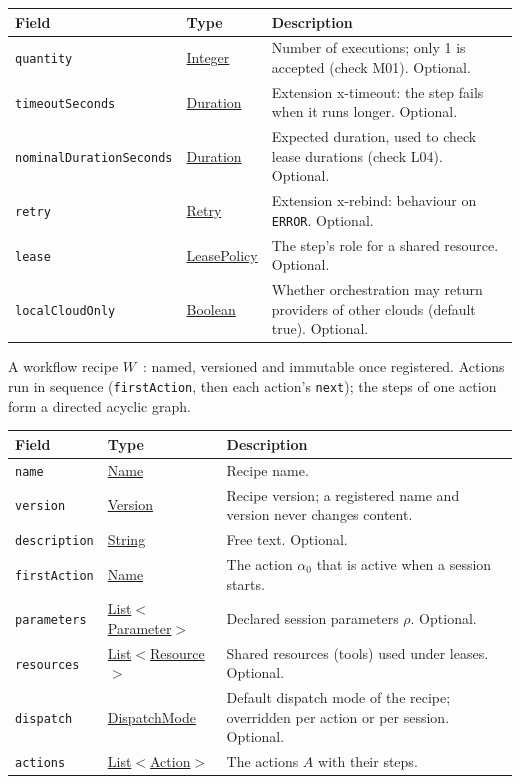 \documentclass[a4paper]{arrowhead}
\newcommand{\mref}[1]{{\textcolor{ArrowheadPurple}{\hyperref[sec:model:#1]{#1}}}}
\newcommand{\pref}[1]{{\textcolor{ArrowheadGrey}{\hyperref[sec:model:primitives:#1]{#1}}}}
\begin{document}
{\small
\begin{longtable}{|p{3.9cm}|p{4.4cm}|p{7.5cm}|}

\hline
\rowcolor{gray!33} Field & Type & Description \\ \hline
\endhead
\texttt{quantity} & \pref{Integer} & Number of executions; only 1 is accepted (check M01). Optional. \\ \hline
\texttt{timeoutSeconds} & \pref{Duration} & Extension x-timeout: the step fails when it runs longer. Optional. \\ \hline
\texttt{nominalDurationSeconds} & \pref{Duration} & Expected duration, used to check lease durations (check L04). Optional. \\ \hline
\texttt{retry} & \mref{Retry} & Extension x-rebind: behaviour on \texttt{ERROR}. Optional. \\ \hline
\texttt{lease} & \mref{LeasePolicy} & The step's role for a shared resource. Optional. \\ \hline
\texttt{localCloudOnly} & \pref{Boolean} & Whether orchestration may return providers of other clouds (default true). Optional. \\ \hline
\end{longtable}
}

A workflow recipe $W$~\cite{varga2026}: named, versioned and immutable once registered. Actions run in sequence (\texttt{firstAction}, then each action's \texttt{next}); the steps of one action form a directed acyclic graph.

{\small
\begin{longtable}{|p{3.9cm}|p{4.4cm}|p{7.5cm}|}

\hline
\rowcolor{gray!33} Field & Type & Description \\ \hline
\endhead
\texttt{name} & \pref{Name} & Recipe name. \\ \hline
\texttt{version} & \pref{Version} & Recipe version; a registered name and version never changes content. \\ \hline
\texttt{description} & \pref{String} & Free text. Optional. \\ \hline
\texttt{firstAction} & \pref{Name} & The action $\alpha_0$ that is active when a session starts. \\ \hline
\texttt{parameters} & \pref{List}$<$\mref{Parameter}$>$ & Declared session parameters $\rho$. Optional. \\ \hline
\texttt{resources} & \pref{List}$<$\mref{Resource}$>$ & Shared resources (tools) used under leases. Optional. \\ \hline
\texttt{dispatch} & \mref{DispatchMode} & Default dispatch mode of the recipe; overridden per action or per session. Optional. \\ \hline
\texttt{actions} & \pref{List}$<$\mref{Action}$>$ & The actions $A$ with their steps. \\ \hline
\end{longtable}
}
\end{document}
